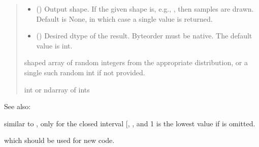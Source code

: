 \documentclass[letterpaper,10pt,english]{sphinxmanual}
\begin{document}
\begin{fulllineitems}
\begin{quote}
\begin{description}
\begin{itemize}
\item {} 
\sphinxAtStartPar
{} (\sphinxstyleliteralemphasis{\sphinxupquote{, }}) \textendash{} Output shape.  If the given shape is, e.g., , then
 samples are drawn.  Default is None, in which case a
single value is returned.

\item {} 
\sphinxAtStartPar
{} (\sphinxstyleliteralemphasis{\sphinxupquote{, }}) \textendash{} 
\sphinxAtStartPar
Desired dtype of the result. Byteorder must be native.
The default value is int.

\sphinxAtStartPar
{}


\end{itemize}

\sphinxAtStartPar
{} \textendash{} \sphinxhyphen{}shaped array of random integers from the appropriate
distribution, or a single such random int if  not provided.

\sphinxAtStartPar
int or ndarray of ints

\end{description}\end{quote}


\begin{sphinxseealso}{See also:}
\begin{description}
\sphinxAtStartPar
similar to , only for the closed interval {[}, \sphinxtitleref{high}{]}, and 1 is the lowest value if  is omitted.

\sphinxAtStartPar
which should be used for new code.


\end{description}
\end{sphinxseealso}
\end{fulllineitems}
\end{document}
